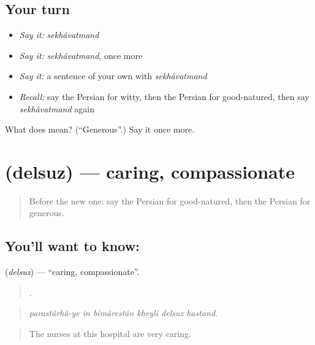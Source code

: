 \subsection*{Your turn}
\begin{itemize}
\raggedright
  \item \emph{Say it:} \emph{sekhâvatmand}
  \item \emph{Say it:} \emph{sekhâvatmand}, once more
  \item \emph{Say it:} a sentence of your own with \emph{sekhâvatmand}
  \item \emph{Recall:} say the Persian for witty, then the Persian for good-natured, then say \emph{sekhâvatmand} again
\end{itemize}

\begin{tcolorbox}[breakable,colback=teal!4,colframe=teal!35!black,title={Before you move on}]
What does  mean? (\textquotedblleft{}Generous\textquotedblright{}.) Say it once more.
\end{tcolorbox}
\section[\texorpdfstring{\fa{دلسوز} (delsuz)}{دلسوز (delsuz)}]{ (delsuz) — caring, compassionate}

\label{lesson:FA-C488-delsuz}



\begin{quote}
Before the new one: say the Persian for good-natured, then the Persian for generous.
\end{quote}

\subsection*{You'll want to know: }
\textbf{} (\emph{delsuz}) — \textquotedblleft{}caring, compassionate\textquotedblright{}.

\begin{quote}
     .
\end{quote}

\begin{quote}
\emph{parastârhâ-ye in bimârestân kheyli delsuz hastand.}
\end{quote}

\begin{quote}
The nurses at this hospital are very caring.
\end{quote}

